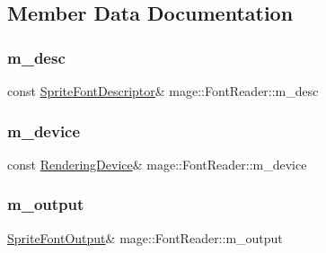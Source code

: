 \subsection{Member Data Documentation}
\hypertarget{classmage_1_1_font_reader_aa5b91df85bfe35e5ce9b6408bf6d8d5e}{}\label{classmage_1_1_font_reader_aa5b91df85bfe35e5ce9b6408bf6d8d5e} 
\subsubsection{\texorpdfstring{m\+\_\+desc}{m\_desc}}
{\footnotesize\ttfamily const \hyperlink{structmage_1_1_sprite_font_descriptor}{Sprite\+Font\+Descriptor}\& mage\+::\+Font\+Reader\+::m\+\_\+desc\hspace{0.3cm}{\ttfamily [private]}}

\hypertarget{classmage_1_1_font_reader_a4897c9ac5031ad1860a6ebb15e33f1b8}{}\label{classmage_1_1_font_reader_a4897c9ac5031ad1860a6ebb15e33f1b8} 
\subsubsection{\texorpdfstring{m\+\_\+device}{m\_device}}
{\footnotesize\ttfamily const \hyperlink{classmage_1_1_rendering_device}{Rendering\+Device}\& mage\+::\+Font\+Reader\+::m\+\_\+device\hspace{0.3cm}{\ttfamily [private]}}

\hypertarget{classmage_1_1_font_reader_accde629b93d12699ec238239be3f39d2}{}\label{classmage_1_1_font_reader_accde629b93d12699ec238239be3f39d2} 
\subsubsection{\texorpdfstring{m\+\_\+output}{m\_output}}
{\footnotesize\ttfamily \hyperlink{structmage_1_1_sprite_font_output}{Sprite\+Font\+Output}\& mage\+::\+Font\+Reader\+::m\+\_\+output\hspace{0.3cm}{\ttfamily [private]}}

